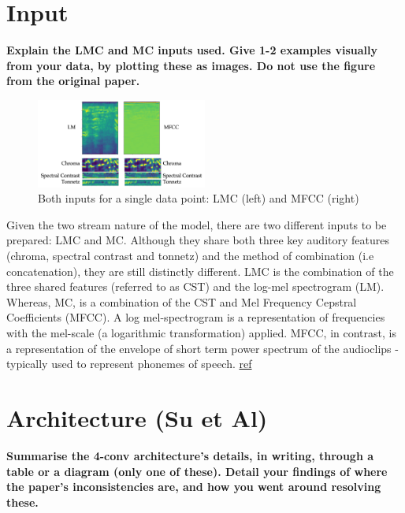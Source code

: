 \documentclass[conference]{IEEEtran}
\begin{document}
\section{Input}
\textbf{Explain the LMC and MC inputs used. Give 1-2 examples visually from your data, by plotting these as images. Do not use the figure from the original paper. }\\

\begin{figure}[h]
    \centering
    \includegraphics[width=0.5\textwidth]{images/input.png}
    \caption{Both inputs for a single data point: LMC (left) and MFCC (right)}
    \label{fig:inputSpectrogram}
\end{figure}{}

Given the two stream nature of the model, there are two different inputs to be prepared: LMC and MC. Although they share both three key auditory features (chroma, spectral contrast and tonnetz) and the method of combination (i.e concatenation), they are still distinctly different. LMC is the combination of the three shared features (referred to as CST) and the log-mel spectrogram (LM). Whereas, MC, is a combination of the CST and Mel Frequency Cepstral Coefficients (MFCC). A log mel-spectrogram is a representation of frequencies with the mel-scale (a logarithmic transformation) applied. MFCC, in contrast, is a representation of the envelope of short term power spectrum of the audioclips - typically used to represent phonemes of speech. \href{http://practicalcryptography.com/miscellaneous/machine-learning/guide-mel-frequency-cepstral-coefficients-mfccs/}{ref}



\section{Architecture (Su et Al)} \label{section:Architecture}
\textbf{Summarise the 4-conv architecture’s details, in writing, through a table or a diagram (only one of these). Detail your findings of where the paper’s inconsistencies are, and how you went around resolving these.} 
\end{document}
